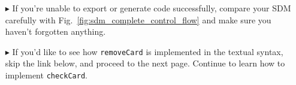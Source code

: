 \begin{itemize}
\item[$\blacktriangleright$] If you're unable to export or generate code successfully, compare your SDM carefully with Fig.~\ref{fig:sdm_complete_control_flow}
and make sure you haven't forgotten anything.

\item[$\blacktriangleright$] If you'd like to see how \texttt{removeCard} is implemented in the textual syntax, skip the link below, and proceed to the
next page. Continue to learn how to implement \texttt{checkCard}.


\end{itemize}

